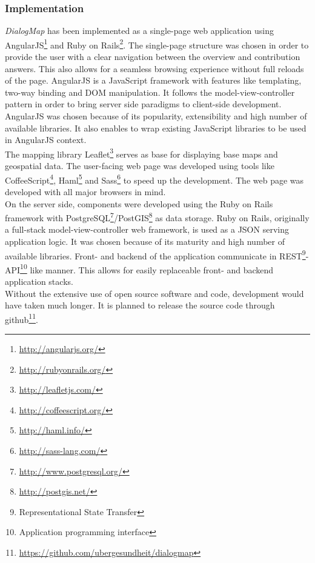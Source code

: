 \documentclass{sigchi}
\begin{document}
\subsubsection{Implementation}
\textit{DialogMap} has been implemented as a single-page web application using AngularJS\footnote{\url{http://angularjs.org/}} and Ruby on Rails\footnote{\url{http://rubyonrails.org/}}. The single-page structure was chosen in order to provide the user with a clear navigation between the overview and contribution answers. This also allows for a seamless browsing experience without full reloads of the page. AngularJS is a JavaScript framework with features like templating, two-way binding and DOM manipulation. It follows the model-view-controller pattern in order to bring server side paradigms to client-side development. AngularJS was chosen because of its popularity, extensibility and high number of available libraries. It also enables to wrap existing JavaScript libraries to be used in AngularJS context.\\
The mapping library Leaflet\footnote{\url{http://leafletjs.com/}} serves as base for displaying base maps and geospatial data. The user-facing web page was developed using tools like CoffeeScript\footnote{\url{http://coffeescript.org/}}, Haml\footnote{\url{http://haml.info/}} and Sass\footnote{\url{http://sass-lang.com/}} to speed up the development. The web page was developed with all major browsers in mind.\\
On the server side, components were developed using the Ruby on Rails framework with PostgreSQL\footnote{\url{http://www.postgresql.org/}}/PostGIS\footnote{\url{http://postgis.net/}} as data storage. Ruby on Rails, originally a full-stack model-view-controller web framework, is used as a JSON serving application logic. It was chosen because of its maturity and high number of available libraries. Front- and backend of the application communicate in REST\footnote{Representational State Transfer}-API\footnote{Application programming interface} like manner. This allows for easily replaceable front- and backend application stacks.\\
Without the extensive use of open source software and code, development would have taken much longer. It is planned to release the source code through github\footnote{\url{https://github.com/ubergesundheit/dialogmap}}.
\end{document}
